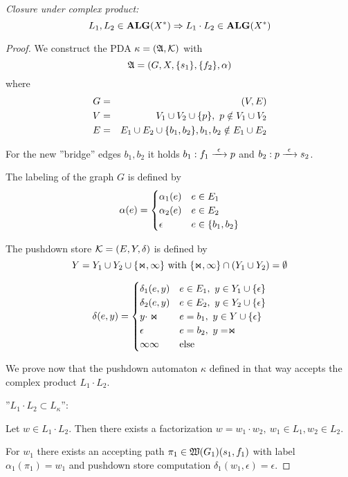 {\em Closure under complex product:}
\[ L_1, L_2 \in \mbox{{\bf ALG}}(X^*) \Rightarrow L_1 \cdot L_2 \in \mbox{{\bf ALG}}(X^*) \]
\begin{proof}
We construct the PDA $\kappa = (\mbox{$\mathfrak{A}$}, \mbox{$\mathcal{K}$})$ with 
\[\mbox{$\mathfrak{A}$} = (G, X, \mbox{$\{s_1\}$}, \mbox{$\{f_2\}$}, \alpha)\]
where
\begin{eqnarray*}
G &=& (V, E) \\
V &=& V_1 \cup V_2 \cup \mbox{$\{p\}$},\ p \notin V_1 \cup V_2 \\
E &=& E_1 \cup E_2 \cup \mbox{$\{b_1, b_2\}$},b_1, b_2 \notin E_1 \cup E_2
\end{eqnarray*}

For the new ''bridge'' edges $b_1, b_2$ it holds $b_1: f_1 \xrightarrow{\ {\epsilon}\ } p$
and $b_2: p \xrightarrow{\ {\epsilon}\ } s_2$.

The labeling of the graph $G$ is defined by 
\[ \alpha(e) = \begin{cases} 
\alpha_1(e) 	& e \in E_1 \\
\alpha_2(e) 	& e \in E_2 \\
\epsilon 			& e \in \mbox{$\{b_1, b_2\}$} 
\end{cases}\]

\missingfigure

The pushdown store $\mbox{$\mathcal{K}$} = (E, Y, \delta)$ is defined by
\[ Y = Y_1 \cup Y_2 \cup \mbox{$\{\Join, \infty\}$} \text{ with }\mbox{$\{\Join, \infty\}$} \cap
(Y_1 \cup Y_2) = \emptyset \]

\[ \delta(e, y) = \begin{cases}
\delta_1(e, y) 					& e \in E_1,\ y \in Y_1 \cup \mbox{$\{\epsilon\}$} \\
\delta_2(e, y) 					& e \in E_2,\ y \in Y_2 \cup \mbox{$\{\epsilon\}$} \\
y \cdot \Join 					& e = b_1,\ y \in Y \cup \mbox{$\{\epsilon\}$} \\
\epsilon 								& e = b_2,\ y = \Join \\
\infty\infty 						& \text{else}
\end{cases}\]

We prove now that the pushdown automaton $\kappa$ defined in that way accepts
the complex product $L_1 \cdot L_2$.

''$L_1 \cdot L_2 \subset L_{\kappa}$'':

Let $w \in L_1 \cdot L_2$. Then there exists a factorization $w = w_1 \cdot
w_2,\ w_1 \in L_1, w_2 \in L_2$.

For $w_1$ there exists an accepting path $\pi_1 \in \mbox{$\mathfrak{W}({G_1})$}(s_1,
f_1)$ with label $\alpha_1(\pi_1) = w_1$ and pushdown store computation
$\delta_1(w_1, \epsilon) = \epsilon$.


\end{proof}

